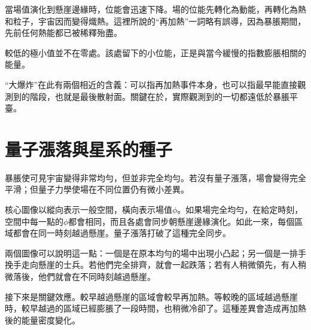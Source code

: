 當場值演化到懸崖邊緣時，位能會迅速下降。場的位能先轉化為動能，再轉化為熱和粒子，宇宙因而變得熾熱。這裡所說的``再加熱''一詞略有誤導，因為暴脹期間，先前任何熱能都已被稀釋殆盡。

較低的極小值並不在零處。該處留下的小位能，正是與當今緩慢的指數膨脹相關的能量。

\begin{classroomqa}
\end{classroomqa}

``大爆炸''在此有兩個相近的含義：可以指再加熱事件本身，也可以指最早能直接觀測到的階段，也就是最後散射面。關鍵在於，實際觀測到的一切都遠低於暴脹平臺。

\begin{classroomqa}
\end{classroomqa}

\section{量子漲落與星系的種子}

暴脹使可見宇宙變得非常均勻，但並非完全均勻。若沒有量子漲落，場會變得完全平滑；但量子力學使場在不同位置仍有微小差異。

核心圖像以縱向表示一般空間，橫向表示場值\(\phi\)。如果場完全均勻，在給定時刻，空間中每一點的\(\phi\)都會相同，而且各處會同步朝懸崖邊緣演化。如此一來，每個區域都會在同一時刻越過懸崖。量子漲落打破了這種完全同步。

兩個圖像可以說明這一點：一個是在原本均勻的場中出現小凸起；另一個是一排手挽手走向懸崖的士兵。若他們完全排齊，就會一起跌落；若有人稍微領先，有人稍微落後，他們就會在不同時刻越過懸崖。

接下來是關鍵效應。較早越過懸崖的區域會較早再加熱。等較晚的區域越過懸崖時，較早越過的區域已經膨脹了一段時間，也稍微冷卻了。這種差異會造成再加熱後的能量密度變化。

\begin{classroomqa}
\end{classroomqa}

